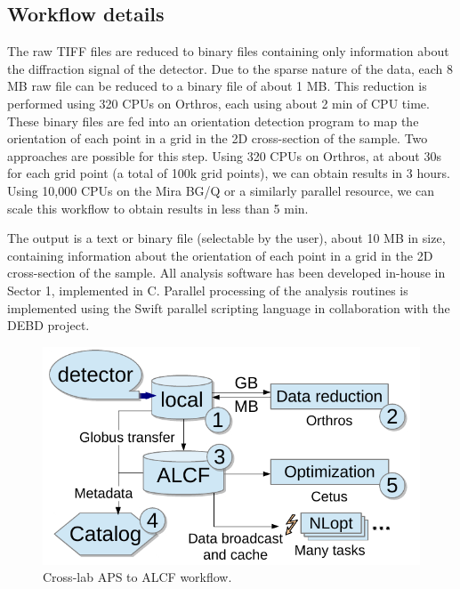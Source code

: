 \documentclass[conference,10pt]{IEEEtran}
\begin{document}
\subsection{Workflow details}

The raw TIFF files are reduced to binary files containing only
information about the diffraction signal of the detector. Due to the
sparse nature of the data, each 8 MB raw file can be reduced to a
binary file of about 1 MB. This reduction is performed using 320 CPUs
on Orthros, each using about 2 min of CPU time. These binary files are
fed into an orientation detection program to map the orientation of
each point in a grid in the 2D cross-section of the sample. Two
approaches are possible for this step.  Using 320 CPUs on Orthros, at
about 30s for each grid point (a total of 100k grid points), we can
obtain results in 3 hours.  Using 10,000 CPUs on the Mira BG/Q or a
similarly parallel resource, we can scale this workflow to obtain
results in less than 5 min.

The output is a text or binary file (selectable by the user), about 10
MB in size, containing information about the orientation of each point
in a grid in the 2D cross-section of the sample.  All analysis
software has been developed in-house in Sector 1, implemented in
C. Parallel processing of the analysis routines is implemented using
the Swift parallel scripting language in collaboration with the DEBD
project.

\begin{figure}
  \begin{center}
    \includegraphics[scale=0.58,clip=true,trim=0.05in -0.3in 0 0]
                    {img/NFHEDM.pdf}
    \caption{Cross-lab APS to ALCF workflow.
      \label{figure:nfhedm-workflow}}
  \end{center}
\end{figure}
\end{document}
